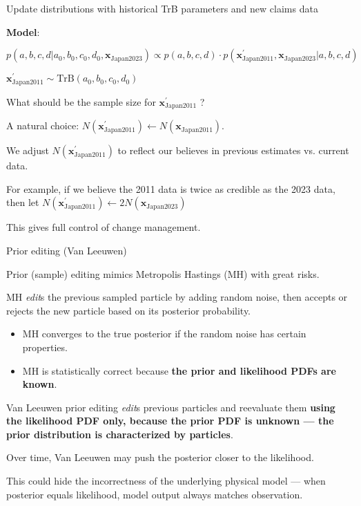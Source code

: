 \documentclass[aspectratio=169]{beamer}
\begin{document}
\begin{frame}{ Update distributions with historical TrB parameters and new claims data }

\textbf{Model}:\smallskip

\begin{center}
$p(a,b,c,d|a_0, b_0, c_0, d_0, \boldsymbol{x}_{\text{Japan2023}} )  \propto   p(a,b,c,d)\cdot p(\boldsymbol{x}_{\text{Japan2011}}^\prime, \boldsymbol{x}_{\text{Japan2023}} | a, b, c,d )$
\end{center}
\begin{center}
$\boldsymbol{x}_{\text{Japan2011}}^\prime\sim\text{TrB}(a_0, b_0, c_0, d_0)$
\end{center}\medskip%

What should be the sample size for $\boldsymbol{x}_{\text{Japan2011}}^\prime$ ?\medskip

A natural choice: $N\left(\boldsymbol{x}_{\text{Japan2011}}^\prime\right) \gets N\left(\boldsymbol{x}_{\text{Japan2011}}\right)$.
\medskip%

We adjust $N\left(\boldsymbol{x}_{\text{Japan2011}}^\prime\right)$ to reflect our believes in previous estimates vs. current data.\medskip

For example, if we believe the 2011 data is twice as credible as the 2023 data, then let
$N\left(\boldsymbol{x}_{\text{Japan2011}}^\prime\right)\gets2N\left(\boldsymbol{x}_{\text{Japan2023}}\right)$\medskip%

This gives full control of change management.

\end{frame}


\begin{frame}{Prior editing (Van Leeuwen)}

Prior (sample) editing mimics Metropolis Hastings (MH) with great risks.\medskip%

MH \textit{edit}s the previous sampled particle by adding random noise, then accepts or rejects the new particle based on its posterior probability.\medskip

\begin{itemize}
\item MH converges to the true posterior if the random noise has certain properties.\medskip

\item MH is statistically correct because \textbf{the prior and likelihood PDFs are known}.\medskip%
\end{itemize}

Van Leeuwen prior editing \textit{edit}s previous particles and reevaluate them \textbf{using the likelihood PDF only, because the prior PDF is unknown --- the prior distribution is characterized by particles}. \medskip%

Over time, Van Leeuwen may push the posterior closer to the likelihood.\medskip%

This could hide the incorrectness of the underlying physical model --- when posterior equals likelihood, model output always matches observation.
\end{frame}
\end{document}
